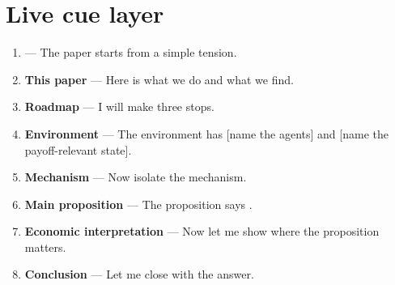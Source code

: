 \documentclass[11pt]{article}
\begin{document}
\section*{Live cue layer}
\raggedright\footnotesize
\begin{enumerate}\setlength{\itemsep}{0.18em}
  \item \textbf{\KeyQuestion} --- The paper starts from a simple tension.
  \item \textbf{This paper} --- Here is what we do and what we find.
  \item \textbf{Roadmap} --- I will make three stops.
  \item \textbf{Environment} --- The environment has [name the agents] and [name the payoff-relevant state].
  \item \textbf{Mechanism} --- Now isolate the mechanism.
  \item \textbf{Main proposition} --- The proposition says \ResultHeadlineSpoken.
  \item \textbf{Economic interpretation} --- Now let me show where the proposition matters.
  \item \textbf{Conclusion} --- Let me close with the answer.
\end{enumerate}
\end{document}
